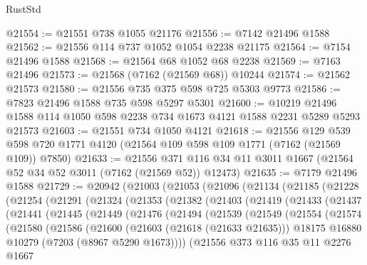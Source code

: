 \begin{lexlean}{RustStd}
\begin{coremodule}
@21554 := @21551 @738 @1055 @21176
@21556 := @7142 @21496 @1588
@21562 := @21556 @114 @737 @1052 @1054 @2238 @21175
@21564 := @7154 @21496 @1588
@21568 := @21564 @68 @1052 @68 @2238
@21569 := @7163 @21496
@21573 := @21568 (@7162 (@21569 @68)) @10244
@21574 := @21562 @21573
@21580 := @21556 @735 @375 @598 @725 @5303 @9773
@21586 := @7823 @21496 @1588 @735 @598 @5297 @5301
@21600 := @10219 @21496 @1588 @114 @1050 @598 @2238 @734 @1673 @4121 @1588 @2231 @5289 @5293 @21573
@21603 := @21551 @734 @1050 @4121
@21618 := @21556
    @129
    @539
    @598
    @720
    @1771
    @4120
    (@21564 @109 @598 @109 @1771 (@7162 (@21569 @109)) @7850)
@21633 := @21556
    @371
    @116
    @34
    @11
    @3011
    @1667
    (@21564 @52 @34 @52 @3011 (@7162 (@21569 @52)) @12473)
@21635 := @7179 @21496 @1588
@21729 := @20942
    (@21003
      (@21053
        (@21096
          (@21134
            (@21185
              (@21228
                (@21254
                  (@21291
                    (@21324
                      (@21353
                        (@21382
                          (@21403
                            (@21419
                              (@21433
                                (@21437
                                  (@21441
                                    (@21445
                                      (@21449
                                        (@21476
                                          (@21494
                                            (@21539
                                              (@21549
                                                (@21554
                                                  (@21574
                                                    (@21580
                                                      (@21586
                                                        (@21600
                                                          (@21603 (@21618 (@21633 @21635)))
                                                          @18175
                                                          @16880
                                                          @10279
                                                          (@7203 (@8967 @5290 @1673))))
                                                      (@21556
                                                        @373
                                                        @116
                                                        @35
                                                        @11
                                                        @2276
                                                        @1667

\end{coremodule}
\end{lexlean}
